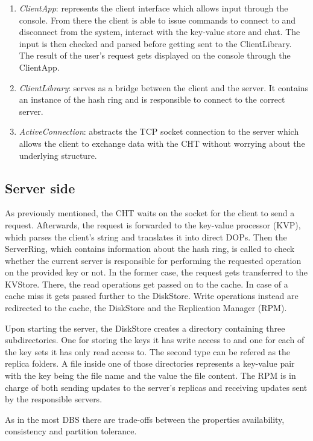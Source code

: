 \begin{enumerate} 
  \item \textit{ClientApp}: represents the client interface which allows input through the console. From there the client is able to issue commands to connect to and disconnect from the system, interact with the key-value store and chat. The input is then checked and parsed before getting sent to the ClientLibrary. The result of the user's request gets displayed on the console through the ClientApp.
  \item \textit{ClientLibrary}: serves as a bridge between the client and the server. It contains an instance of the hash ring and is responsible to connect to the correct server.
  \item \textit{ActiveConnection}: abstracts the TCP socket connection to the server which allows the client to exchange data with the CHT without worrying about the underlying structure.
\end{enumerate}
 
\subsection{Server side}

As previously mentioned, the CHT waits on the socket for the client to send a request. Afterwards, the request is forwarded to the key-value processor (KVP), which parses the client's string and translates it into direct DOPs. Then the ServerRing, which contains information about the hash ring, is called to check whether the current server is responsible for performing the requested operation on the provided key or not. In the former case, the request gets transferred to the KVStore. There, the read operations get passed on to the cache. In case of a cache miss it gets passed further to the DiskStore. Write operations instead are redirected to the cache, the DiskStore and the Replication Manager (RPM). 

Upon starting the server, the DiskStore creates a directory containing three subdirectories. One for storing the keys it has write access to and one for each of the key sets it has only read access to. The second type can be refered as the replica folders. A file inside one of those directories represents a key-value pair with the key being the file name and the value the file content.
The RPM is in charge of both sending updates to the server's replicas and receiving updates sent by the responsible servers.

As in the most DBS there are trade-offs between the properties availability, consistency and partition tolerance.

